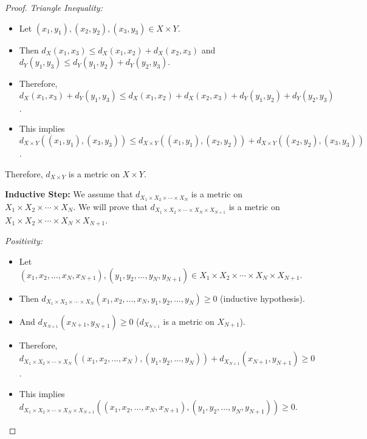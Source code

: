 \documentclass[10pt]{article}
\newenvironment{problem}[2][Problem]{\begin{trivlist}
\item[\hskip \labelsep {\bfseries #1}\hskip \labelsep {\bfseries #2.}]}{\end{trivlist}}
\begin{document}
\begin{problem}{3}
\begin{enumerate}
\begin{proof}
                \textit{Triangle Inequality:}
                \begin{itemize}
                    \item Let $(x_1, y_1), (x_2, y_2), (x_3, y_3) \in X \times Y$.
                    \item Then $d_X(x_1, x_3) \leq d_X(x_1, x_2) + d_X(x_2, x_3)$ and $d_Y(y_1, y_3) \leq d_Y(y_1, y_2) + d_Y(y_2, y_3)$.
                    \item Therefore, $d_X(x_1, x_3) + d_Y(y_1, y_3) \leq d_X(x_1, x_2) + d_X(x_2, x_3) + d_Y(y_1, y_2) + d_Y(y_2, y_3)$.
                    \item This implies $d_{X \times Y}((x_1, y_1), (x_3, y_3)) \leq d_{X \times Y}((x_1, y_1), (x_2, y_2)) + d_{X \times Y}((x_2, y_2), (x_3, y_3))$.
                \end{itemize}

                Therefore, $d_{X \times Y}$ is a metric on $X \times Y$.

                \textbf{Inductive Step:} We assume that $d_{X_1 \times X_2 \times \cdots \times X_N}$ is a metric on $X_1 \times X_2 \times \cdots \times X_N$. We will prove that $d_{X_1 \times X_2 \times \cdots \times X_N \times X_{N+1}}$ is a metric on $X_1 \times X_2 \times \cdots \times X_N \times X_{N+1}$.

                \textit{Positivity:}
                \begin{itemize}
                    \item Let $(x_1, x_2, ..., x_N, x_{N+1}), (y_1, y_2, ..., y_N, y_{N+1}) \in X_1 \times X_2 \times \cdots \times X_N \times X_{N+1}$.
                    \item Then $d_{X_1 \times X_2 \times \cdots \times X_N}(x_1, x_2, ..., x_N, y_1, y_2, ..., y_N) \geq 0$ (inductive hypothesis).
                    \item And $d_{X_{N+1}}(x_{N+1}, y_{N+1}) \geq 0$ ($d_{X_{N+1}}$ is a metric on $X_{N+1}$).
                    \item Therefore, $d_{X_1 \times X_2 \times \cdots \times X_N}((x_1, x_2, ..., x_N), (y_1, y_2, ..., y_N)) + d_{X_{N+1}}(x_{N+1}, y_{N+1}) \geq 0$.
                    \item This implies $d_{X_1 \times X_2 \times \cdots \times X_N \times X_{N+1}}((x_1, x_2, ..., x_N, x_{N+1}), (y_1, y_2, ..., y_N, y_{N+1})) \geq 0$.
                \end{itemize}


\end{proof}
\end{enumerate}
\end{problem}
\end{document}
